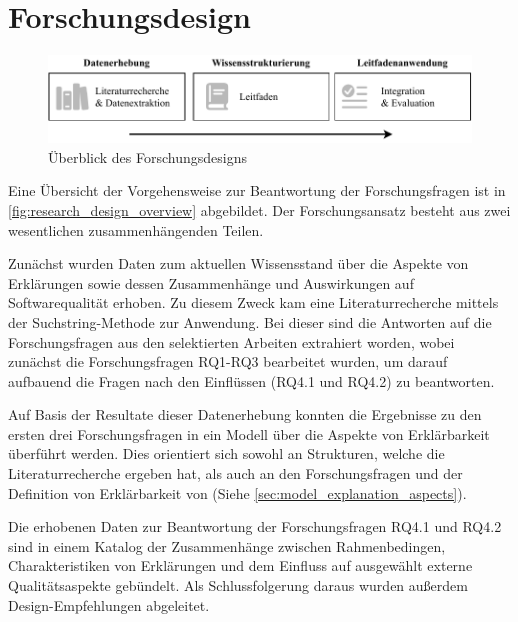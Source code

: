 \section{Forschungsdesign}
\begin{figure}[htb!]
    \begin{center}
        \includegraphics[width=\textwidth]{contents/03_research_design/res/research_design_overview.pdf}
    \end{center}
    \caption{Überblick des Forschungsdesigns}
    \label{fig:research_design_overview}
\end{figure}

Eine Übersicht der Vorgehensweise zur Beantwortung der Forschungsfragen ist in \autoref{fig:research_design_overview} abgebildet. Der Forschungsansatz besteht aus zwei wesentlichen zusammenhängenden Teilen.

Zunächst wurden Daten zum aktuellen Wissensstand über die Aspekte von Erklärungen sowie dessen Zusammenhänge und Auswirkungen auf Softwarequalität erhoben. Zu diesem Zweck kam eine Literaturrecherche mittels der Suchstring-Methode \cite{kitchenham2004procedures} zur Anwendung. Bei dieser sind die Antworten auf die Forschungsfragen aus den selektierten Arbeiten extrahiert worden, wobei zunächst die Forschungsfragen RQ1-RQ3 bearbeitet wurden, um darauf aufbauend die Fragen nach den Einflüssen (RQ4.1 und RQ4.2) zu beantworten.

Auf Basis der Resultate dieser Datenerhebung konnten die Ergebnisse zu den ersten drei Forschungsfragen in ein Modell über die Aspekte von Erklärbarkeit überführt werden. Dies orientiert sich sowohl an Strukturen, welche die Literaturrecherche ergeben hat, als auch an den Forschungsfragen und der Definition von Erklärbarkeit von \citeauthor{chazette_knowledge_nodate} \cite{chazette_knowledge_nodate} (Siehe \autoref{sec:model_explanation_aspects}).

Die erhobenen Daten zur Beantwortung der Forschungsfragen RQ4.1 und RQ4.2 sind in einem Katalog der Zusammenhänge zwischen Rahmenbedingen, Charakteristiken von Erklärungen und dem Einfluss auf ausgewählt externe  Qualitätsaspekte gebündelt. Als Schlussfolgerung daraus wurden außerdem Design-Empfehlungen abgeleitet.

